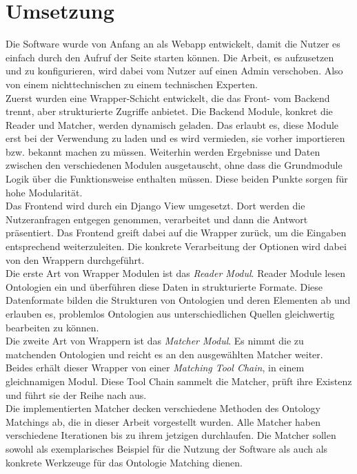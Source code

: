 \section{Umsetzung}
Die Software wurde von Anfang an als Webapp entwickelt, damit die Nutzer es
einfach durch den Aufruf der Seite starten können. Die Arbeit, es aufzusetzen
und zu konfigurieren, wird dabei vom Nutzer auf einen Admin verschoben. Also von
einem nichttechnischen zu einem technischen Experten.\\
Zuerst wurden eine Wrapper-Schicht entwickelt, die das Front- vom Backend
trennt, aber strukturierte Zugriffe anbietet. Die Backend Module, konkret die
Reader und Matcher, werden dynamisch geladen. Das erlaubt es, diese Module erst
bei der Verwendung zu laden und es wird vermieden, sie vorher importieren bzw.
bekannt machen zu müssen. Weiterhin werden Ergebnisse und Daten zwischen den
verschiedenen Modulen ausgetauscht, ohne dass die Grundmodule Logik über die
Funktionsweise enthalten müssen. Diese beiden Punkte sorgen für hohe
Modularität.\\
Das Frontend wird durch ein Django View umgesetzt. Dort werden die
Nutzeranfragen entgegen genommen, verarbeitet und dann die Antwort
präsentiert. Das Frontend greift dabei auf die Wrapper zurück, um die Eingaben
entsprechend weiterzuleiten. Die konkrete Verarbeitung der Optionen wird dabei
von den Wrappern durchgeführt.\\
Die erste Art von Wrapper Modulen ist das \textit{Reader Modul}. Reader Module
lesen Ontologien ein und überführen diese Daten in strukturierte Formate.
Diese Datenformate bilden die Strukturen von Ontologien und deren Elementen ab
und erlauben es, problemlos Ontologien aus unterschiedlichen Quellen
gleichwertig bearbeiten zu können.\\
Die zweite Art von Wrappern ist das \textit{Matcher Modul}. Es nimmt die zu
matchenden Ontologien und reicht es an den ausgewählten Matcher weiter. Beides erhält
dieser Wrapper von einer \textit{Matching Tool Chain}, in einem
gleichnamigen Modul. Diese Tool Chain sammelt die Matcher, prüft ihre
Existenz und führt sie der Reihe nach aus.\\
Die implementierten Matcher decken verschiedene Methoden des Ontology Matchings
ab, die in dieser Arbeit vorgestellt wurden. Alle Matcher haben verschiedene
Iterationen bis zu ihrem jetzigen durchlaufen. Die Matcher sollen sowohl als
exemplarisches Beispiel für die Nutzung der Software als auch als konkrete
Werkzeuge für das Ontologie Matching dienen.\\
